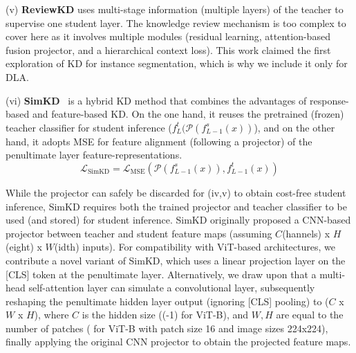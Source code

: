 \documentclass[runningheads]{llncs}
\begin{document}
\noindent(v) \textbf{ReviewKD} \cite{chen2021distilling} uses multi-stage information (multiple layers) of the teacher to supervise one student layer. The knowledge review mechanism is too complex to cover here as it involves multiple modules (residual learning, attention-based fusion projector, and a hierarchical context loss). This work claimed the first exploration of KD for instance segmentation, which is why we include it only for DLA.

\noindent(vi) \textbf{SimKD}~\cite{chen2022knowledge} is a hybrid KD method that combines the advantages of response-based and feature-based KD. On the one hand, it reuses the pretrained (frozen) teacher classifier for student inference ($f^t_{L}(\mathcal{P}(f^s_{L-1}(x))$), and on the other hand, it adopts MSE for feature alignment (following a projector) of the penultimate layer feature-representations.
\begin{equation*}
    \mathcal{L}_{\mathrm{SimKD}}= \mathcal{L}_{\mathrm{MSE }}\left(\mathcal{P}\left(f^{s}_{L-1}\left(x\right)\right), f^{t}_{L-1}\left(x\right)\right)
\end{equation*}

While the projector can safely be discarded for (iv,v) to obtain cost-free student inference, SimKD requires both the trained projector and teacher classifier to be used (and stored) for student inference.
SimKD originally proposed a CNN-based projector between teacher and student feature maps (assuming $C$(hannels) x $H$(eight) x $W$(idth) inputs).
For compatibility with ViT-based architectures, we contribute a novel variant of SimKD, which uses a linear projection layer on the [CLS] token at the penultimate layer. Alternatively, we draw upon \cite[Theorem 1]{cordonnier2019relationship} that a multi-head self-attention layer can simulate a convolutional layer, subsequently reshaping the penultimate hidden layer output (ignoring [CLS] pooling) to ($C$ x $W$ x $H$), where $C$ is the hidden size ((-1) for ViT-B), and $W,H$ are equal to the number of patches ( for ViT-B with patch size 16 and image sizes 224x224), finally applying the original CNN projector to obtain the projected feature maps. %
\end{document}
